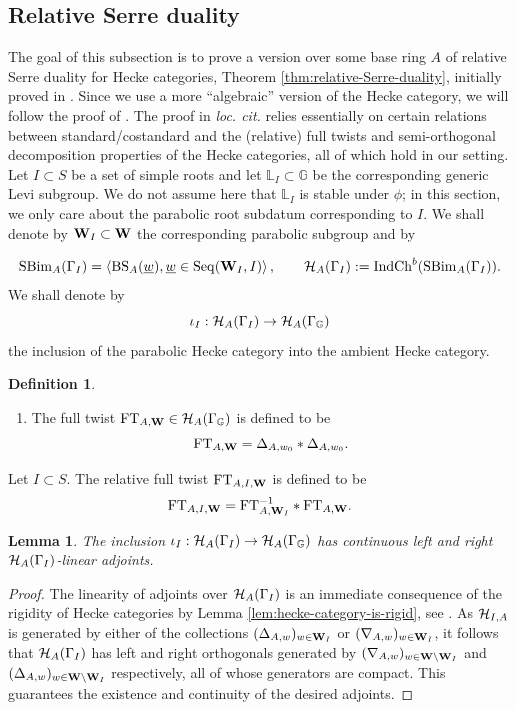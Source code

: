 \documentclass[a4paper, 10pt, oneside, reqno]{amsart}
\theoremstyle{plain}
\newtheorem{lem}[thm]{Lemma}
\theoremstyle{definition}
\newtheorem{defi}[thm]{Definition}
\theoremstyle{remark}
\newcommand{\Gbb}{\mathbb{G}}
\newcommand{\BS}{\mathrm{BS}}
\newcommand{\Seq}{\mathrm{Seq}}
\newcommand{\FT}{\mathrm{FT}}
\newcommand{\Lbb}{\mathbb{L}}
\begin{document}
\subsection{Relative Serre duality}

The goal of this subsection is to prove a version over some base ring $A$ of relative Serre duality for Hecke categories, Theorem \ref{thm:relative-Serre-duality}, initially proved in \cite{HoLiRelativeSerre}. Since we use a more ``algebraic'' version of the Hecke category, we will follow the proof of \cite{SandvikRelativeSerreDuality}. The proof in \emph{loc. cit.} relies essentially on certain relations between standard/costandard and the (relative) full twists and semi-orthogonal decomposition properties of the Hecke categories, all of which hold in our setting. Let $I \subset S$ be a set of simple roots and let $\Lbb_I \subset \Gbb$ be the corresponding generic Levi subgroup. We do not assume here that $\Lbb_I$ is stable under $\phi$; in this section, we only care about the parabolic root subdatum corresponding to $I$. We shall denote by $\mathbf{W}_{I} \subset \mathbf{W}$ the corresponding parabolic subgroup and by 

$$\SBim_{A}(\Gamma_{I}) = \left\langle \BS_A(\underline{w}), \underline{w} \in \Seq(\Wbf_I, I) \right\rangle, \qquad \Hcal_{A}(\Gamma_{I}) := \Ind\Ch^b(\SBim_{A}(\Gamma_{I})).$$
We shall denote by 
$$\iota_I : \Hcal_{A}(\Gamma_{I}) \to \Hcal_{A}(\Gamma_{\Gbb})$$
the inclusion of the parabolic Hecke category into the ambient Hecke category. 

\begin{defi}\label{defi:relative-full-twists}
\begin{enumerate}
\item The full twist $\FT_{A,\Wbf} \in \Hcal_{A}(\Gamma_{\Gbb})$ is defined to be 
$$\FT_{A,\Wbf} = \Delta_{A, w_0} * \Delta_{A, w_0}.$$
\end{enumerate}
Let $I \subset S$. The relative full twist $\FT_{A,I, \Wbf}$ is defined to be 
$$\FT_{A, I, \Wbf} = \FT_{A, \Wbf_I}^{-1} * \FT_{A, \Wbf}.$$
\end{defi}

\begin{lem}
The inclusion $\iota_I : \Hcal_{A}(\Gamma_{I}) \to \Hcal_{A}(\Gamma_{\Gbb})$ has continuous left and right $\mathcal{H}_{A}(\Gamma_{I})$-linear adjoints. 
\end{lem}

\begin{proof}
The linearity of adjoints over $\mathcal{H}_{A}(\Gamma_{I})$ is an immediate consequence of the rigidity of Hecke categories by Lemma \ref{lem:hecke-category-is-rigid}, see \cite[Chap. 1, Lemma 9.3.6]{GaiRozDAG1}. As $\mathcal{H}_{I,A}$ is generated by either of the collections $(\Delta_{A,w})_{w \in \mathbf{W}_I}$ or $(\nabla_{A,w})_{w \in \mathbf{W}_I}$, it follows that $\mathcal{H}_{A}(\Gamma_{I})$ has left and right orthogonals generated by $(\nabla_{A,w})_{w \in \mathbf{W}\setminus \mathbf{W}_I}$ and $(\Delta_{A,w})_{w \in \mathbf{W}\setminus \mathbf{W}_I}$ respectively, all of whose generators are compact. This guarantees the existence and continuity of the desired adjoints. 
\end{proof}
\end{document}
